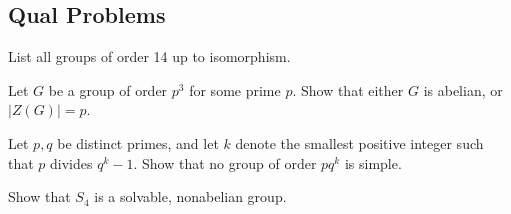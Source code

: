 \subsection{Qual Problems}

\begin{problem}
\label{prob:2.8}
List all groups of order 14 up to isomorphism.
\end{problem}

\begin{problem}
\label{prob:2.9}
Let $G$ be a group of order $p^3$ for some prime $p$. Show that either $G$ is abelian, or $\left| Z(G) \right| = p$.
\end{problem}

\begin{problem}
\label{prob:2.10}
Let $p,q$ be distinct primes, and let $k$ denote the smallest positive integer such that $p$ divides $q^k - 1$. Show that no group of order $pq^k$ is simple.
\end{problem}

\begin{problem}
\label{prob:2.11}
Show that $S_4$ is a solvable, nonabelian group.
\end{problem}